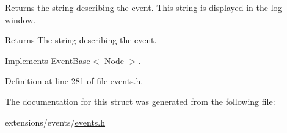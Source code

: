 Returns the string describing the event. This string is displayed in the log window. 

\begin{DoxyReturn}{Returns}
The string describing the event. 
\end{DoxyReturn}


Implements \hyperlink{structEventBase_a39b9ccca5a07eb242fbacdcdb9ced3c6}{Event\+Base$<$ Node $>$}.



Definition at line 281 of file events.\+h.



The documentation for this struct was generated from the following file\+:\begin{DoxyCompactItemize}
\item 
extensions/events/\hyperlink{events_8h}{events.\+h}\end{DoxyCompactItemize}
